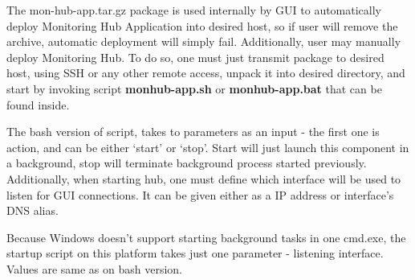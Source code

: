 The mon-hub-app.tar.gz package is used internally by GUI to automatically deploy Monitoring Hub Application into desired host, so if user will remove the archive, automatic deployment will simply fail. Additionally, user may manually deploy Monitoring Hub. To do so, one must just transmit package to desired host, using SSH or any other remote access, unpack it into desired directory, and start by invoking script {\bf monhub-app.sh} or {\bf monhub-app.bat} that can be found inside. 

The bash version of script, takes to parameters as an input - the first one is action, and can be either \lq{}start\rq{} or \lq{}stop\rq{}. Start will just launch this component in a background, stop will terminate background process started previously. Additionally, when starting hub, one must define which interface will be used to listen for GUI connections. It can be given either as a IP address or interface\rq{}s DNS alias.  

Because Windows doesn\rq{}t support starting background tasks in one cmd.exe, the startup script on this platform takes just one parameter - listening interface. Values are same as on bash version.         